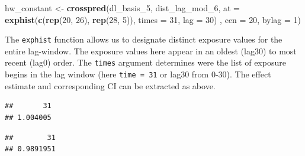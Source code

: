 \documentclass[
]{book}
\newenvironment{Shaded}{\begin{snugshade}}{\end{snugshade}}
\newcommand{\AttributeTok}[1]{\textcolor[rgb]{0.13,0.29,0.53}{#1}}
\newcommand{\DecValTok}[1]{\textcolor[rgb]{0.00,0.00,0.81}{#1}}
\newcommand{\FunctionTok}[1]{\textcolor[rgb]{0.13,0.29,0.53}{\textbf{#1}}}
\newcommand{\NormalTok}[1]{#1}
\newcommand{\OtherTok}[1]{\textcolor[rgb]{0.56,0.35,0.01}{#1}}
\newcommand{\SpecialCharTok}[1]{\textcolor[rgb]{0.81,0.36,0.00}{\textbf{#1}}}
\begin{document}
\begin{Shaded}
\begin{Highlighting}[]
\NormalTok{hw\_constant }\OtherTok{\textless{}{-}} \FunctionTok{crosspred}\NormalTok{(dl\_basis\_5, dist\_lag\_mod\_6, }
                         \AttributeTok{at =} \FunctionTok{exphist}\NormalTok{(}\FunctionTok{c}\NormalTok{(}\FunctionTok{rep}\NormalTok{(}\DecValTok{20}\NormalTok{, }\DecValTok{26}\NormalTok{), }\FunctionTok{rep}\NormalTok{(}\DecValTok{28}\NormalTok{, }\DecValTok{5}\NormalTok{)), }\AttributeTok{times =} \DecValTok{31}\NormalTok{, }\AttributeTok{lag =} \DecValTok{30}\NormalTok{) , }
                         \AttributeTok{cen =} \DecValTok{20}\NormalTok{, }\AttributeTok{bylag =} \DecValTok{1}\NormalTok{)}
\end{Highlighting}
\end{Shaded}

The \texttt{exphist} function allows us to designate distinct exposure values for the entire lag-window. The exposure values here appear in an oldest (lag30) to most recent (lag0) order. The \texttt{times} argument determines were the list of exposure begins in the lag window (here \texttt{time\ =\ 31} or lag30 from 0-30). The effect estimate and corresponding CI can be extracted as above.

\begin{Shaded}
\end{Shaded}

\begin{verbatim}
##       31 
## 1.004005
\end{verbatim}

\begin{Shaded}
\end{Shaded}

\begin{verbatim}
##        31 
## 0.9891951
\end{verbatim}

\begin{Shaded}
\end{Shaded}
\end{document}
